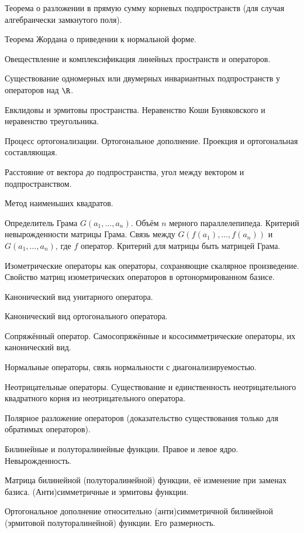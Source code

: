 \documentclass[a4paper]{article}
\begin{document}
\begin{nums}{-2}
\item Теорема о разложении в прямую сумму корневых подпространств (для случая алгебраически замкнутого поля).
\item Теорема Жордана о приведении к нормальной форме.
\item Овеществление и комплексификация линейных пространств и операторов.
\item Существование одномерных или двумерных инвариантных подпространств у операторов над $\R$.
\item Евклидовы и эрмитовы пространства. Неравенство Коши Буняковского и неравенство треугольника.
\item Процесс ортогонализации. Ортогональное дополнение. Проекция и ортогональная составляющая.
\item Расстояние от вектора до подпространства, угол между вектором и подпространством.
\item Метод наименьших квадратов.
\item Определитель Грама $G(a_1,\ldots,a_n)$. Объём $n$ мерного параллелепипеда. Критерий невырожденности
матрицы Грама. Связь между
$G(f(a_1),\ldots,f(a_n))$ и $G(a_1,\ldots,a_n)$, где $f$ оператор. Критерий для матрицы быть матрицей Грама.
\item Изометрические операторы как операторы, сохраняющие скалярное произведение. Свойство матриц
изометрических операторов в ортонормированном базисе.
\item Канонический вид унитарного оператора.
\item Канонический вид ортогонального оператора.
\item Сопряжённый оператор. Самосопряжённые и кососимметрические операторы, их канонический вид.
\item Нормальные операторы, связь нормальности с диагонализируемостью.
\item Неотрицательные операторы. Существование и единственность неотрицательного квадратного корня из неотрицательного оператора.
\item Полярное разложение операторов (доказательство существования только для обратимых операторов).
\item Билинейные и полуторалинейные функции. Правое и левое ядро. Невырожденность.
\item Матрица билинейной (полуторалинейной) функции, её изменение при заменах базиса. (Анти)симметрич\-ные и эрмитовы функции.
\item Ортогональное дополнение относительно (анти)симметричной билинейной (эрмитовой полуторалинейной) функции. Его размерность.

\end{nums}
\end{document}

